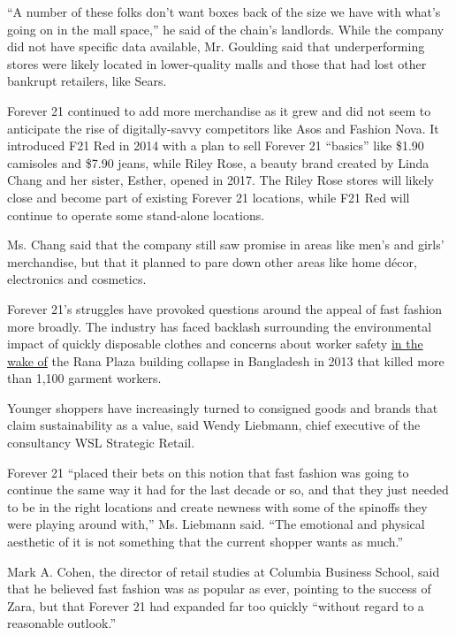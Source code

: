 ``A number of these folks don't want boxes back of the size we have with
what's going on in the mall space,'' he said of the chain's landlords.
While the company did not have specific data available, Mr. Goulding
said that underperforming stores were likely located in lower-quality
malls and those that had lost other bankrupt retailers, like Sears.

Forever 21 continued to add more merchandise as it grew and did not seem
to anticipate the rise of digitally-savvy competitors like Asos and
Fashion Nova. It introduced F21 Red in 2014 with a plan to sell Forever
21 ``basics'' like \$1.90 camisoles and \$7.90 jeans, while Riley Rose,
a beauty brand created by Linda Chang and her sister, Esther, opened in
2017. The Riley Rose stores will likely close and become part of
existing Forever 21 locations, while F21 Red will continue to operate
some stand-alone locations.

Ms. Chang said that the company still saw promise in areas like men's
and girls' merchandise, but that it planned to pare down other areas
like home décor, electronics and cosmetics.

Forever 21's struggles have provoked questions around the appeal of fast
fashion more broadly. The industry has faced backlash surrounding the
environmental impact of quickly disposable clothes and concerns about
worker safety
\href{https://www.nytimes3xbfgragh.onion/2015/06/02/world/asia/bangladesh-rana-plaza-murder-charges.html}{in
the wake of} the Rana Plaza building collapse in Bangladesh in 2013 that
killed more than 1,100 garment workers.

Younger shoppers have increasingly turned to consigned goods and brands
that claim sustainability as a value, said Wendy Liebmann, chief
executive of the consultancy WSL Strategic Retail.

Forever 21 ``placed their bets on this notion that fast fashion was
going to continue the same way it had for the last decade or so, and
that they just needed to be in the right locations and create newness
with some of the spinoffs they were playing around with,'' Ms. Liebmann
said. ``The emotional and physical aesthetic of it is not something that
the current shopper wants as much.''

Mark A. Cohen, the director of retail studies at Columbia Business
School, said that he believed fast fashion was as popular as ever,
pointing to the success of Zara, but that Forever 21 had expanded far
too quickly ``without regard to a reasonable outlook.''

